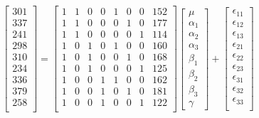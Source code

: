 \documentclass[12pt,a4paper]{report}
\begin{document}
\begin{enumerate}
\begin{equation*}
\begin{bmatrix}
301\\
337\\
241\\
298\\
310\\
234\\
336\\
379\\
258\\
\end{bmatrix}
=\begin{bmatrix}
1 &1& 0& 0& 1& 0& 0& 152\\
1 &1& 0& 0& 0& 1& 0& 177\\
1& 1& 0& 0& 0& 0& 1& 114\\
1& 0& 1& 0& 1& 0& 0& 160\\
1& 0& 1& 0& 0& 1& 0& 168\\
1& 0& 1& 0& 0& 0& 1& 125\\
1& 0& 0& 1& 1& 0& 0& 162\\
1& 0& 0& 1& 0& 1& 0& 181\\
1& 0& 0& 1& 0& 0& 1& 122\\
\end{bmatrix}
\begin{bmatrix}
\mu\\
\alpha_{1}\\
\alpha_{2}\\
\alpha_{3}\\
\beta_{1}\\
\beta_{2}\\
\beta_{3}\\
\gamma
\end{bmatrix}+
\begin{bmatrix}
\epsilon_{11}\\
\epsilon_{12}\\
\epsilon_{13}\\
\epsilon_{21}\\
\epsilon_{22}\\
\epsilon_{23}\\
\epsilon_{31}\\
\epsilon_{32}\\
\epsilon_{33}\\
\end{bmatrix}
\end{equation*}






\end{enumerate}
\end{document}
